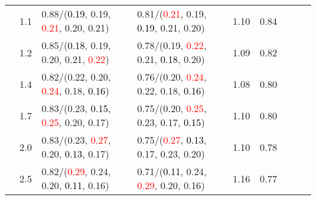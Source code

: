 \documentclass[10pt,a4paper]{report}
\begin{document}
\begin{table}[!htbp]
\begin{center}
{\begin{tabular}{ccllccccc}
				  & 1.1                               & 0.88/(\textcolor{black}{0.19}, 0.19, \textcolor{red}{0.21}, 0.20, 0.21)                                                                                                                       & 0.81/(\textcolor{red}{0.21}, 0.19, \textcolor{black}{0.19}, 0.21, 0.20)                                                                                                                       & 1.10             & 0.84                     \\
				  & 1.2                               & 0.85/(\textcolor{black}{0.18}, 0.19, 0.20, 0.21, \textcolor{red}{0.22})                                                                                                                       & 0.78/(0.19, \textcolor{red}{0.22}, 0.21, \textcolor{black}{0.18}, 0.20)                                                                                                                       & 1.09             & 0.82                     \\
				  & 1.4                               & 0.82/(0.22, 0.20, \textcolor{red}{0.24}, 0.18, \textcolor{black}{0.16})                                                                                                                       & 0.76/(0.20, \textcolor{red}{0.24}, 0.22, 0.18, \textcolor{black}{0.16})                                                                                                                       & 1.08             & 0.80                     \\
				  & 1.7                               & 0.83/(0.23, \textcolor{black}{0.15}, \textcolor{red}{0.25}, 0.20, 0.17)                                                                                                                       & 0.75/(0.20, \textcolor{red}{0.25}, 0.23, 0.17, \textcolor{black}{0.15})                                                                                                                       & 1.10             & 0.80                     \\
				  & 2.0                               & 0.83/(0.23, \textcolor{red}{0.27}, 0.20, \textcolor{black}{0.13}, 0.17)                                                                                                                       & 0.75/(\textcolor{red}{0.27}, \textcolor{black}{0.13}, 0.17, 0.23, 0.20)                                                                                                                       & 1.10             & 0.78                     \\
				  & 2.5                               & 0.82/(\textcolor{red}{0.29}, 0.24, 0.20, \textcolor{black}{0.11}, 0.16)                                                                                                                       & 0.71/(\textcolor{black}{0.11}, 0.24, \textcolor{red}{0.29}, 0.20, 0.16)                                                                                                                       & 1.16             & 0.77                     \\

\end{tabular}}
\end{center}
\end{table}
\end{document}
